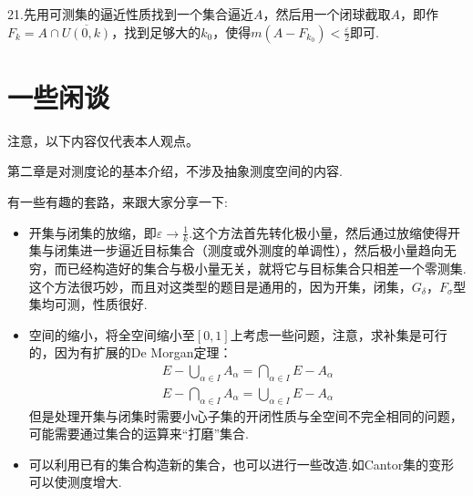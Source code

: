 \documentclass[bwprint, withoutpreface]{cumcmthesis}
\begin{document}
21.先用可测集的逼近性质找到一个集合逼近$A$，然后用一个闭球截取$A$，即作$F_k = A \cap \overline{U(0, k)}$，找到足够大的$k_0$，使得$m(A - F_{k_0}) < \frac{\varepsilon}{2}$即可.

\section{一些闲谈}
\indent 注意，以下内容仅代表本人观点。

第二章是对测度论的基本介绍，不涉及抽象测度空间的内容.

有一些有趣的套路，来跟大家分享一下:
\begin{itemize}[itemindent=2em]
	\item 开集与闭集的放缩，即$\varepsilon \to \frac{1}{k}$.这个方法首先转化极小量，然后通过放缩使得开集与闭集进一步逼近目标集合（测度或外测度的单调性），然后极小量趋向无穷，而已经构造好的集合与极小量无关，就将它与目标集合只相差一个零测集.这个方法很巧妙，而且对这类型的题目是通用的，因为开集，闭集，$G_{\delta}$，$F_{\sigma}$型集均可测，性质很好.
	\begin{center}
	\qquad
	\end{center}
	\item 空间的缩小，将全空间缩小至$[0, 1]$上考虑一些问题，注意，求补集是可行的，因为有扩展的De Morgan定理：
	\begin{align*}
		E - \bigcup_{\alpha \in I}{A_{\alpha}} = \bigcap_{\alpha \in I}{E - A_{\alpha}} \\
		E - \bigcap_{\alpha \in I}{A_{\alpha}} = \bigcup_{\alpha \in I}{E - A_{\alpha}}
	\end{align*}
	但是处理开集与闭集时需要小心子集的开闭性质与全空间不完全相同的问题，可能需要通过集合的运算来“打磨”集合.
	\item 可以利用已有的集合构造新的集合，也可以进行一些改造.如Cantor集的变形可以使测度增大.

\end{itemize}
\end{document}
